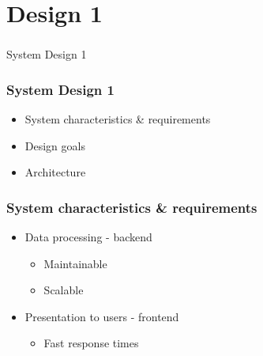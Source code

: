 \section[Design 1]{Design 1}

\begin{frame}
  \frametitle{}
  \begin{center}
    {\Huge System Design 1}
  \end{center}
\end{frame}

\begin{frame}
    \frametitle{System Design 1}
    \centering
    \begin{itemize}
      \item System characteristics \& requirements
      \item Design goals
      \item Architecture
    \end{itemize}
\end{frame}

\begin{frame}
    \frametitle{System characteristics \& requirements}
    \centering
    \begin{itemize}
      \item Data processing - backend
      \begin{itemize}
        \item Maintainable
        \item Scalable
      \end{itemize}
      \item Presentation to users - frontend
      \begin{itemize}
        \item Fast response times
      \end{itemize}
    \end{itemize}
\end{frame}

